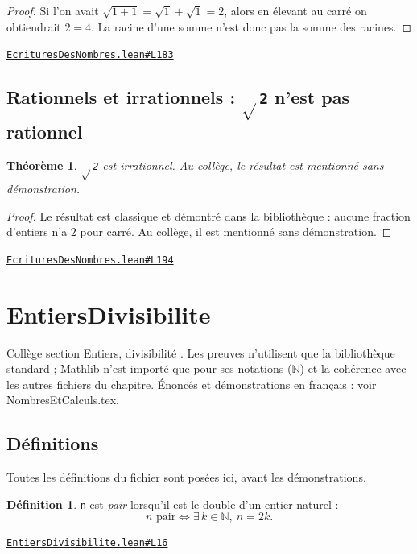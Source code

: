 \documentclass[11pt,a4paper]{article}
\theoremstyle{definition}
\newtheorem{definition}{Définition}
\theoremstyle{plain}
\newtheorem{theoreme}{Théorème}
\newcommand{\source}[2]{\par\smallskip\noindent\hfill{\footnotesize\href{#1}{\texttt{#2}}}\par\smallskip}
\begin{document}
\begin{proof}
Si l'on avait $\sqrt{1+1} = \sqrt1 + \sqrt1 = 2$, alors en élevant au carré on
obtiendrait $2 = 4$. La racine d'une somme n'est donc pas la somme des racines.
\end{proof}
\source{https://github.com/Commutator-IO/learn-lean/blob/main/cours/01-college/01-nombres-et-calculs/EcrituresDesNombres.lean\#L183}{EcrituresDesNombres.lean\#L183}

\subsection{Rationnels et irrationnels : \texttt{\(\sqrt{}\)2} n'est pas rationnel}

\begin{theoreme}
\texttt{\(\sqrt{}\)2} est irrationnel. Au collège, le résultat est mentionné sans démonstration.
\end{theoreme}

\begin{proof}
Le résultat est classique et démontré dans la bibliothèque : aucune fraction
d'entiers n'a $2$ pour carré. Au collège, il est mentionné sans démonstration.
\end{proof}
\source{https://github.com/Commutator-IO/learn-lean/blob/main/cours/01-college/01-nombres-et-calculs/EcrituresDesNombres.lean\#L194}{EcrituresDesNombres.lean\#L194}

\section{EntiersDivisibilite}

\noindent
Collège \textemdash{} section \og{} Entiers, divisibilité \fg{}.
Les preuves n'utilisent que la bibliothèque standard ; Mathlib n'est importé que pour
ses notations (\(\mathbb{N}\)) et la cohérence avec les autres fichiers du chapitre.
Énoncés et démonstrations en français : voir NombresEtCalculs.tex.

\subsection{Définitions}

\noindent
Toutes les définitions du fichier sont posées ici, avant les démonstrations.

\begin{definition}
\texttt{n} est \emph{pair} lorsqu'il est le double d'un entier naturel :
\[ n \text{ pair} \iff \exists\, k \in \mathbb{N},\ n = 2k . \]
\end{definition}
\source{https://github.com/Commutator-IO/learn-lean/blob/main/cours/01-college/01-nombres-et-calculs/EntiersDivisibilite.lean\#L16}{EntiersDivisibilite.lean\#L16}
\end{document}
